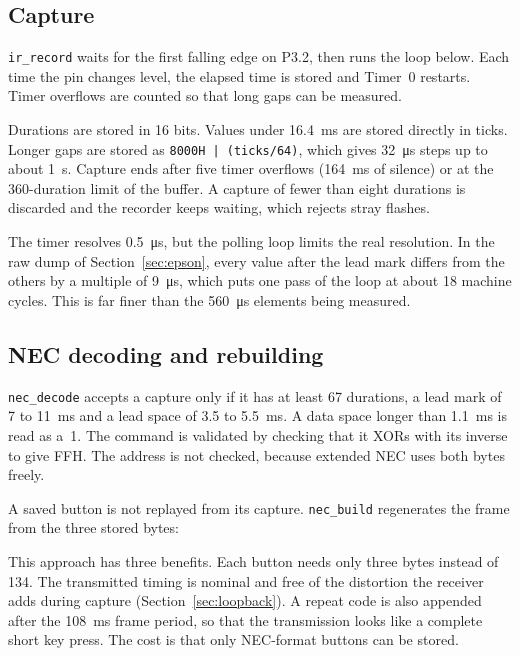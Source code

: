 \documentclass[11pt,a4paper]{article}
\newcommand{\code}[1]{\texttt{#1}}
\begin{document}
\subsection{Capture}

\code{ir\_record} waits for the first falling edge on P3.2, then runs the loop below. Each time the pin changes level, the elapsed time is stored and Timer~0 restarts. Timer overflows are counted so that long gaps can be measured.



Durations are stored in 16 bits. Values under \qty{16.4}{\milli\second} are stored directly in ticks. Longer gaps are stored as \code{8000H | (ticks/64)}, which gives \qty{32}{\micro\second} steps up to about \qty{1}{\second}. Capture ends after five timer overflows (\qty{164}{\milli\second} of silence) or at the 360-duration limit of the buffer. A capture of fewer than eight durations is discarded and the recorder keeps waiting, which rejects stray flashes.

The timer resolves \qty{0.5}{\micro\second}, but the polling loop limits the real resolution. In the raw dump of Section~\ref{sec:epson}, every value after the lead mark differs from the others by a multiple of \qty{9}{\micro\second}, which puts one pass of the loop at about 18 machine cycles. This is far finer than the \qty{560}{\micro\second} elements being measured.

\subsection{NEC decoding and rebuilding}

\code{nec\_decode} accepts a capture only if it has at least 67 durations, a lead mark of 7 to \qty{11}{\milli\second} and a lead space of 3.5 to \qty{5.5}{\milli\second}. A data space longer than \qty{1.1}{\milli\second} is read as a~1. The command is validated by checking that it XORs with its inverse to give FFH. The address is not checked, because extended NEC uses both bytes freely.

A saved button is not replayed from its capture. \code{nec\_build} regenerates the frame from the three stored bytes:



This approach has three benefits. Each button needs only three bytes instead of 134. The transmitted timing is nominal and free of the distortion the receiver adds during capture (Section~\ref{sec:loopback}). A repeat code is also appended after the \qty{108}{\milli\second} frame period, so that the transmission looks like a complete short key press. The cost is that only NEC-format buttons can be stored.
\end{document}

